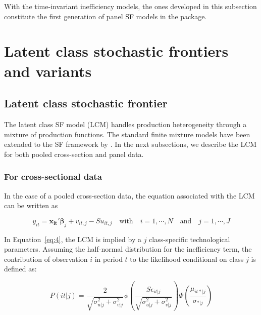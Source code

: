 \documentclass[nojss]{jss}
\begin{document}
With the time-invariant inefficiency models, the ones developed in this subsection
constitute the first generation of panel SF models in the  package.



\section{Latent class stochastic frontiers and variants} \label{sec:modelcm}

\subsection{Latent class stochastic frontier}

The latent class SF model (LCM) handles production heterogeneity
through a mixture of production functions. The standard finite mixture models have
been extended to the SF framework by \citet{cau03, orea04}. In the next subsections, 
we describe the LCM for both pooled cross-section and panel data.

\subsubsection{For cross-sectional data}

In the case of a pooled cross-section data, the equation associated with the LCM can
be written as

\begin{equation} \label{eq:4}
y_{it} = \mathbf{x_{it}'}\bm{\beta}_j + v_{it,j} - Su_{it,j} \quad \text{with} \quad i = 1, \cdots, N \quad \text{and} \quad j = 1, \cdots, J
\end{equation}

In Equation~\ref{eq:4}, the LCM is implied by a $j$ class-specific
technological parameters. Assuming the half-normal distribution for the 
inefficiency term, the contribution of observation $i$ in period $t$ to the 
likelihood conditional on class $j$ is defined as: 

\begin{equation}\label{eq:5}
P(it|j) = \frac{2}{\sqrt{\sigma_{u|j}^2 + 
 \sigma_{v|j}^2}}\phi\left(\frac{S\epsilon_{it|j}}{\sqrt{
 \sigma_{u|j}^2 +\sigma_{v|j}^2}}\right)\Phi\left(\frac{
 \mu_{it*|j}}{\sigma_{*|j}}\right)
\end{equation}
\end{document}
